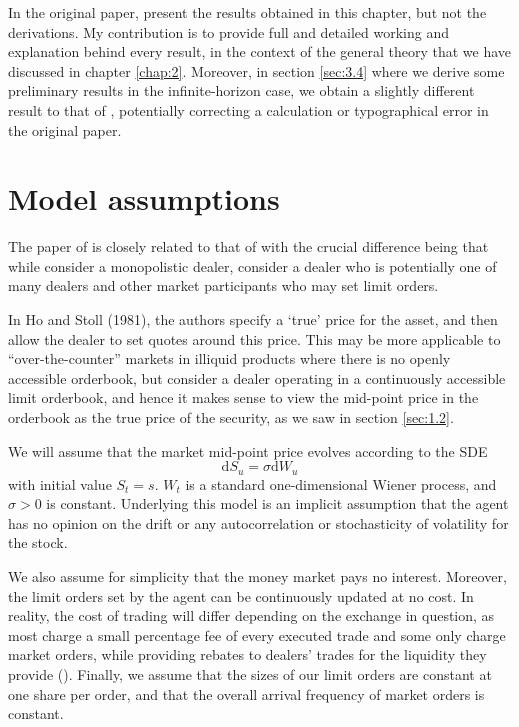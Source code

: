 In the original paper, \textcite{AS2008} present the results obtained in this 
chapter, but not the derivations. My contribution is to provide full and detailed 
working and explanation behind every result, in the context of the general theory 
that we have discussed in chapter \ref{chap:2}. Moreover, in section \ref{sec:3.4}
where we derive some preliminary results in the infinite-horizon case, we obtain a 
slightly different result to that of \textcite{AS2008}, potentially correcting 
a calculation or typographical error in the original paper.

\section{Model assumptions}\label{sec:3.2}

The paper of \textcite{AS2008} is closely related to that of \textcite{HS1981} with the 
crucial difference being that while \textcite{HS1981} consider a monopolistic dealer,
\textcite{AS2008} consider a dealer who is potentially one of many dealers 
and other market participants who may set limit orders.

In Ho and Stoll (1981),
the authors specify a `true' price for the asset, and then allow the dealer to set 
quotes around this price. This may be more applicable to ``over-the-counter'' markets in 
illiquid products where there is no openly accessible orderbook, but \textcite{AS2008}
consider a dealer operating in a continuously accessible limit orderbook, and hence it makes
sense to view the mid-point price in the orderbook as the true price of the security, as 
we saw in section \ref{sec:1.2}.

We will assume that the market mid-point price evolves according to the SDE
\begin{equation}
    \mathrm dS_u=\sigma\mathrm dW_u
\end{equation}
with initial value $S_t=s$. $W_t$ is a standard one-dimensional Wiener process, and
$\sigma>0$ is constant. Underlying this model is an implicit assumption that the agent
has no opinion on the drift or any autocorrelation or stochasticity of volatility 
for the stock. 

We also assume for simplicity that the money market pays no interest. Moreover, the
limit orders set by the agent can be continuously updated at no cost. In reality, 
the cost of trading will differ depending on the exchange in question, as most
charge a small percentage fee of every executed trade and some only charge market orders,
while providing rebates to dealers' trades for the liquidity they provide (\cite{SEC}). Finally,
we assume that the sizes of our limit orders are constant at one share per order,
and that the overall arrival frequency of market orders is constant.

